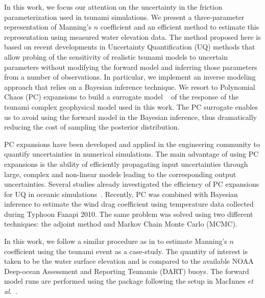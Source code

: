 In this work, we focus our attention on the uncertainty in the friction
parameterization used in tsunami simulations. We present a three-parameter 
representation of Manning's $n$ coefficient and an efficient method
to estimate this representation using measured water elevation data. The method proposed here 
is based on recent developments in Uncertainty Quantification (UQ) methods that allow 
probing of the sensitivity of realistic tsunami  models to uncertain parameters
without modifying the forward model and inferring those parameters
from a number of observations.  In particular, we implement an inverse modeling
approach that relies on a Bayesian inference technique.  We resort to
Polynomial Chaos (PC) expansions to build a surrogate model ~\cite{Najm:2009,Alexanderian2012,Elsheikh2014,Young2013}
of the response of the tsunami complex geophysical model \geoclaw used in this work.
The PC surrogate enables us to avoid using the forward model in
the Bayesian inference, thus dramatically reducing the cost of sampling the
posterior distribution.

PC expansions have been developed and applied in the engineering community to
quantify uncertainties in numerical simulations.  The main advantage of
using PC expansions is the ability of efficiently propagating input uncertainties through 
large, complex and non-linear models leading to the corresponding output uncertainties. 
Several studies already investigated the efficiency of PC expansions for 
UQ in oceanic simulations~\citep{thacker2012,ashwanth2010,Alexanderian2012,sraj:2013a}. 
Recently, PC was combined with Bayesian inference to estimate the wind drag coefficient 
using temperature data collected during Typhoon Fanapi 2010. The same problem was 
solved using two different techniques: the adjoint method and Markov Chain Monte Carlo
(MCMC)\cite{sraj:2013a,sraj:2013b}.

In this work, we follow a similar procedure as in \cite{sraj:2013a,sraj:2013b}
to estimate Manning's $n$ coefficient using the \tohoku tsunami
event as a case-study. The quantity of interest is taken to be the water surface
elevation and is compared to the available NOAA Deep-ocean Assessment and
Reporting Tsunamis (DART) buoys.  The forward model runs are performed using the
\geoclaw package following the setup in MacInnes \emph{et al.}~\cite{MacInnes:2013cr}.

